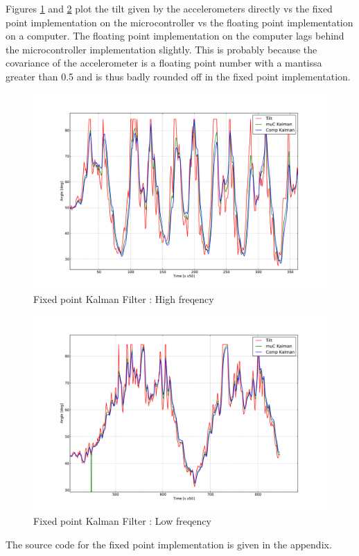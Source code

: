 Figures \ref{fig:5_KF_fp_hf} and \ref{fig:5_KF_fp_lf} plot the tilt given by the accelerometers directly 
vs the fixed point implementation on the microcontroller vs the floating point implementation on a
computer. The floating point implementation on the computer
lags behind the microcontroller implementation slightly. This is probably because the covariance of the
accelerometer is a floating point number with a mantissa greater than 0.5 and is thus badly
rounded off in the fixed point implementation.
\newline
\begin{figure}[!h]
\centering
\includegraphics[scale=0.70, angle=270]{fig/kf_fp_hf.pdf}
\caption{Fixed point Kalman Filter : High freqency}
\label{fig:5_KF_fp_hf}
\end{figure}
\begin{figure}[!h]
\centering
\includegraphics[scale=0.70, angle=270]{fig/kf_fp_lf.pdf}
\caption{Fixed point Kalman Filter : Low freqency}
\label{fig:5_KF_fp_lf}
\end{figure}

The source code for the fixed point implementation is given in the appendix.
















